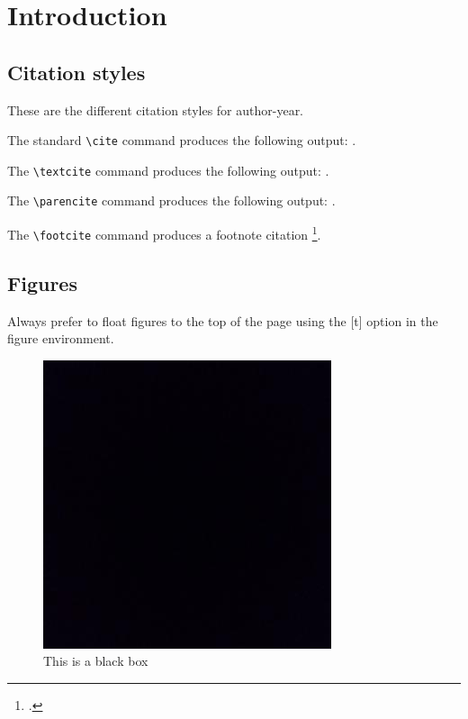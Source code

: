 \chapter{Introduction}
\label{chap:introduction}

\section{Citation styles}

These are the different citation styles for author-year.

The standard \verb=\cite= command produces the following output: \cite{clarke1990rendezvous}.

The \verb=\textcite= command produces the following output: \textcite{clarke1990rendezvous}.


The \verb=\parencite= command produces the following output: \parencite{clarke1990rendezvous}.

The \verb=\footcite= command produces a footnote citation \footcite{clarke1990rendezvous}.

\clearpage          %

\section{Figures}

Always prefer to float figures to the top of the page using the [t] option in the figure environment.

\begin{figure}[t]
    \centering
    \includegraphics{figures/blackbox.jpeg}
    \caption{This is a black box}
    \label{fig:fig_1}
\end{figure}

